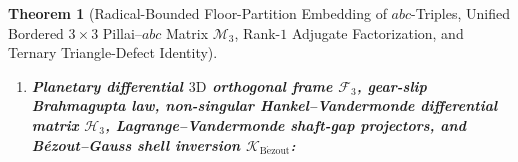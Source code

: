 \documentclass[11pt,a4paper]{article}
\theoremstyle{plain}
\newtheorem{theorem}{Theorem}[section]
\theoremstyle{definition}
\begin{document}
\begin{theorem}[Radical-Bounded Floor-Partition Embedding of $abc$-Triples, Unified Bordered $3\times 3$ Pillai--$abc$ Matrix $\mathcal{M}_3$, Rank-$1$ Adjugate Factorization, and Ternary Triangle-Defect Identity]
\begin{enumerate}[label=\textbf{(\roman*)},leftmargin=*]
  \[
    \mathcal{P}_3(A,B,C) \;=\; \begin{pmatrix}
      A^2(B+C) & (B+2C)^3 & (2B+C)^3 \\
      (A+2C)^3 & B^2(A+C) & (2A+C)^3 \\
      (A-2B)^3 & (2A-B)^3 & C^2(A-B)
    \end{pmatrix},\qquad
    \mathcal{P}_3(A,B,C)\begin{pmatrix} A \\ B \\ -C \end{pmatrix} \;\equiv\; \begin{pmatrix} 0 \\ 0 \\ 0 \end{pmatrix},
  \]
  with $\det\mathcal{P}_3(A,B,C) \equiv 0$ and trace $\operatorname{Tr}\mathcal{P}_3(A,B,C) \equiv A C(A+C)$ ($\operatorname{Tr}\mathcal{P}_3(3,125,128) = 3\cdot 128\cdot 131 = 50\,304$), while the base $7 = |{\triangle}(3)|-1$ links the Pad\'e coefficient sum $\widehat{P}_3(1,1) = 81 = 3^4$ and the phase ring modulus $|\mathbb{Z}_{512}| = 512 = 2^9$ via the dual Fermat--Catalan identities $2^5 + 7^2 = 3^4 = 81$ and $13^2 + 7^3 = 2^9 = 512$.
\item \textbf{Planetary differential $3\mathrm{D}$ orthogonal frame $\mathcal{F}_3$, gear-slip Brahmagupta law, non-singular Hankel--Vandermonde differential matrix $\mathcal{H}_3$, Lagrange--Vandermonde shaft-gap projectors, and B\'ezout--Gauss shell inversion $\mathcal{K}_{\mathrm{B\acute{e}zout}}$:}

\end{enumerate}
\end{theorem}
\end{document}
